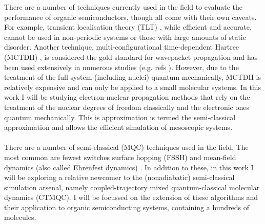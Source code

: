 There are a number of  techniques currently used in the field to evaluate the performance of organic semiconductors, though all come with their own caveats. For example, transient localisation theory (TLT) \cite{Nematiaram2019, PhysRevB.83.081202, Fratini_2016}, while efficient and accurate, cannot be used in non-periodic systems or those with large amounts of static disorder. Another technique, multi-configurational time-dependent Hartree (MCTDH) \cite{MCTDH, cattarius_all_2001}, is considered the gold standard for wavepacket propagation and has been used extensively in numerous studies (e.g. refs ). However, due to the treatment of the full system  (including nuclei) quantum mechanically, MCTDH is relatively expensive and can only be applied to a small molecular systems. In this work I will be studying electron-nuclear propagation methods that rely on the treatment of the nuclear degrees of freedom classically and the electronic ones quantum mechanically. This is approximation is termed the semi-classical approximation and allows the efficient simulation of mesoscopic systems.
\\\\
There are a number of semi-classical (MQC)\add{, } techniques used in the field. The most common are fewest switches surface hopping (FSSH) \cite{FSSH_orig} and mean-field dynamics (also called Ehrenfest dynamics) \cite{Ehrenfest1927}. In addition to these, in this work I will be exploring a relative newcomer to the (nonadiabatic) semi-classical simulation arsenal, namely coupled-trajectory mixed quantum-classical molecular dynamics (CTMQC). I will be focussed on the extension of these algorithms and their application to organic semiconducting systems, containing a hundreds of molecules.

